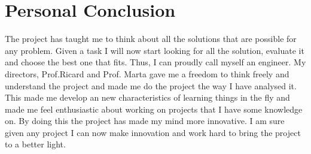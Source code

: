 \section{Personal Conclusion}
The project has taught me to think about all the solutions that are possible for any problem. Given a task I will now start looking for all the solution, evaluate it and choose the best one that fits. Thus, I can proudly call myself an engineer. My directors, Prof.Ricard and Prof. Marta gave me a freedom to think freely and understand the project and made me do the project the way I have analysed it.  This made me develop an new characteristics of learning things in the fly and made me feel enthusiastic about working on projects that I have some knowledge on. By doing this the project has made my mind more innovative. I am sure given any project I can now make innovation and work hard to bring the project to a better light.


{}




